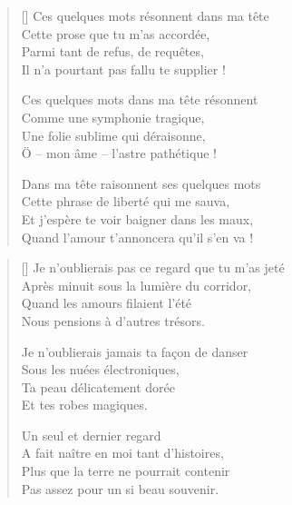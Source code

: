 \newpage

\settowidth{\versewidth}{Et j'espère te voir baigner dans les maux,}
\begin{verse}[\versewidth]
Ces quelques mots résonnent dans ma tête \\
Cette prose que tu m'as accordée, \\
Parmi tant de refus, de requêtes, \\
Il n'a pourtant pas fallu te supplier !

Ces quelques mots dans ma tête résonnent \\
Comme une symphonie tragique, \\
Une folie sublime qui déraisonne, \\
Ö -- mon âme -- l'astre pathétique !

Dans ma tête raisonnent ses quelques mots \\
Cette phrase de liberté qui me sauva, \\
Et j'espère te voir baigner dans les maux, \\
Quand l'amour t'annoncera qu'il s'en va !
\end{verse}

\newpage

\settowidth{\versewidth}{Et j'espère te voir baigner dans les maux,}
\begin{verse}[\versewidth]
Je n'oublierais pas ce regard que tu m'as jeté \\
Après minuit sous la lumière du corridor, \\
Quand les amours filaient l'été \\
Nous pensions à d'autres trésors.

Je n'oublierais jamais ta façon de danser \\
Sous les nuées électroniques, \\
Ta peau délicatement dorée \\
Et tes robes magiques.

Un seul et dernier regard \\
A fait naître en moi tant d'histoires, \\
Plus que la terre ne pourrait contenir \\
Pas assez pour un si beau souvenir.
\end{verse}

